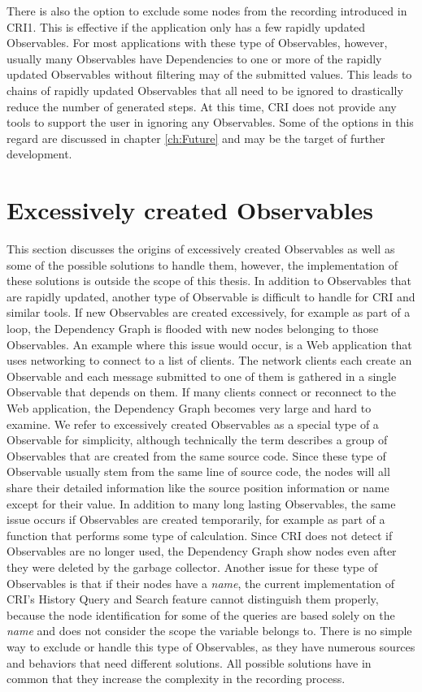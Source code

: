 There is also the option to exclude some nodes from the recording introduced in CRI1. This is effective if the application only has a few rapidly updated Observables. For most applications with these type of Observables, however, usually many Observables have Dependencies to one or more of the rapidly updated Observables without filtering may of the submitted values. This leads to chains of rapidly updated Observables that all need to be ignored to drastically reduce the number of generated steps. At this time, CRI does not provide any tools to support the user in ignoring any Observables. Some of the options in this regard are discussed in chapter \ref{ch:Future} and may be the target of further development.

\section{Excessively created Observables}
\label{sec:DynamicallyCreated}
This section discusses the origins of excessively created Observables as well as some of the possible solutions to handle them, however, the implementation of these solutions is outside the scope of this thesis.
In addition to Observables that are rapidly updated, another type of Observable is difficult to handle for CRI and similar tools. If new Observables are created excessively, for example as part of a loop, the Dependency Graph is flooded with new nodes belonging to those Observables. An example where this issue would occur, is a Web application that uses networking to connect to a list of clients. The network clients each create an Observable and each message submitted to one of them is gathered in a single Observable that depends on them. If many clients connect or reconnect to the Web application, the Dependency Graph becomes very large and hard to examine. We refer to excessively created Observables as a special type of a Observable for simplicity, although technically the term describes a group of Observables that are created from the same source code. Since these type of Observable usually stem from the same line of source code, the nodes will all share their detailed information like the source position information or name except for their value. In addition to many long lasting Observables, the same issue occurs if Observables are created temporarily, for example as part of a function that performs some type of calculation. Since CRI does not detect if Observables are no longer used, the Dependency Graph show nodes even after they were deleted by the garbage collector. Another issue for these type of Observables is that if their nodes have a \emph{name}, the current implementation of CRI's History Query and Search feature cannot distinguish them properly, because the node identification for some of the queries are based solely on the \emph{name} and does not consider the scope the variable belongs to.
There is no simple way to exclude or handle this type of Observables, as they have numerous sources and behaviors that need different solutions. All possible solutions have in common that they increase the complexity in the recording process.

